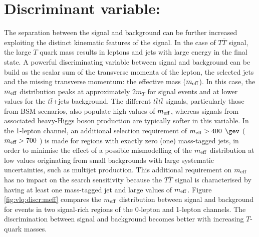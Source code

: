 \section[Discriminating variable: $m_{\rm eff}$]{Discriminant variable: }
\label{sec:vlq:discrvar}
The separation between  the signal and background can be further increased exploiting the distinct kinematic features of the signal.  In the case of $T\bar{T}$ signal, the large $T$ quark mass results in leptons and jets with large energy in the final state. A powerful discriminating variable between signal and background can be build as the scalar sum of the transverse momenta of the lepton, the selected jets and the missing transverse momentum: the effective mass ($m_{\rm eff}$). In this case, the $m_{\rm eff}$ distribution peaks at approximately $2m_{T}$ for signal events and at lower values for the $t\bar{t}$+jets background. The different $t\bar{t}t\bar{t}$ signals, particularly those from BSM scenarios, also populate high values of $m_{\rm eff}$, whereas signals from associated heavy-Higgs boson production are typically softer in this variable. In the 1-lepton channel, an additional selection requirement of $m_{\rm eff} > 400$ $\gev$ ($m_{\rm eff} > 700$ \gev) is made for regions with exactly zero (one) mass-tagged jets, in order to minimise the effect of a possible mismodelling of the $m_{\rm eff}$ distribution at low values originating from small backgrounds with large systematic uncertainties, such as multijet production. This additional requirement on $m_{\rm eff}$ has no impact on the search sensitivity because the $T\bar{T}$ signal is characterised by having at least one mass-tagged jet and large values of $m_{\rm eff}$. Figure \ref{fig:vlq:discr:meff} compares the $m_{\rm eff}$ distribution between signal and background for events in two signal-rich regions of the 0-lepton and 1-lepton channels. The discrimination between signal and background becomes better with increasing $T$-quark masses. 


